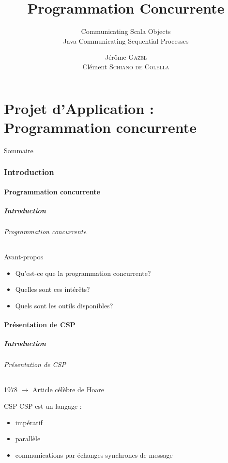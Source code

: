 \documentclass[slidetop,11pt]{beamer}
\title{Programmation Concurrente}
\subtitle{Communicating Scala Objects\\Java Communicating Sequential Processes}
\author{Jérôme \textsc{Gazel} \\ Clément \textsc{Schiano de Colella}}
\institute{\'Ecole Centrale de Nantes}
\date{\oldstylenums{vendredi 25 mars 2011}}
\begin{document}
\frame{\titlepage}
%
\part{Projet d'Application : Programmation concurrente} 
\begin{frame}{Sommaire}
  \small \tableofcontents[hideallsubsections]
\end{frame} 


\section{Introduction}
\subsection{Programmation concurrente}
\begin{frame}[label=pagesimple]
  \frametitle{Introduction}
  \framesubtitle{Programmation concurrente}
  \begin{block}{Avant-propos}
  \begin{itemize}[<+->]
    \item Qu'est-ce que la programmation concurrente?
    \item Quelles sont ces intérêts?
    \item Quels sont les outils disponibles?
  \end{itemize}
  \end{block}
\end{frame}

\subsection{Présentation de CSP}
\begin{frame} 
  \frametitle{Introduction}
  \framesubtitle{Présentation de CSP}
  1978 $\rightarrow$ Article célèbre de Hoare\\ 
  \pause
  \begin{block}{CSP}
  CSP est un langage :
\begin{itemize}[<+->]
\item impératif
\item parallèle
\item communications par échanges synchrones de message
 \end{itemize}
 \end{block}
\end{frame}
\end{document}
